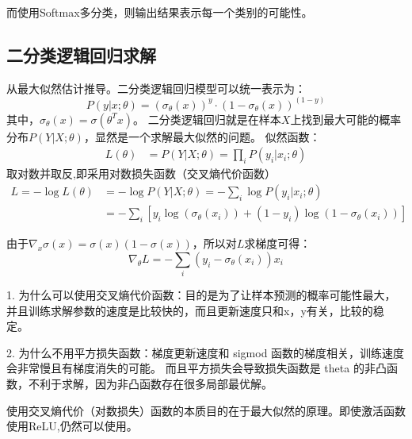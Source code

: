 而使用Softmax多分类，则输出结果表示每一个类别的可能性。

\subsection{二分类逻辑回归求解}
从最大似然估计推导。二分类逻辑回归模型可以统一表示为：
\begin{equation*}
    P(y|x;\theta) = (\sigma_\theta(x))^y \cdot (1-\sigma_\theta(x))^{(1-y)}
\end{equation*}
其中，$\sigma_\theta(x) = \sigma(\theta^T x)$。
二分类逻辑回归就是在样本$X$上找到最大可能的概率分布$P(Y|X;\theta)$，显然是一个求解最大似然的问题。
似然函数：
\begin{align*}
    L(\theta) &= P(Y|X;\theta) = \prod_i P(y_i|x_i;\theta) 
\end{align*}
取对数并取反,即采用对数损失函数（交叉熵代价函数）
\begin{align*}
    L = -\log L(\theta) &= -\log P(Y|X;\theta) = -\sum_i \log P(y_i|x_i;\theta) \\ 
    &= - \sum_i \left[ y_i \log (\sigma_\theta(x_i)) + (1-y_i) \log (1-\sigma_\theta(x_i))\right]
\end{align*}

由于$\nabla_x \sigma(x) = \sigma(x)(1-\sigma(x))$，所以对$L$求梯度可得：
\begin{equation*}
    \nabla_\theta L = -\sum_i (y_i - \sigma_\theta(x_i))x_i
\end{equation*}

{}

1. 为什么可以使用交叉熵代价函数：目的是为了让样本预测的概率可能性最大，
并且训练求解参数的速度是比较快的，而且更新速度只和x，y有关，比较的稳定。

2. 为什么不用平方损失函数：梯度更新速度和 sigmod 函数的梯度相关，训练速度会非常慢且有梯度消失的可能。
而且平方损失会导致损失函数是 theta 的非凸函数，不利于求解，因为非凸函数存在很多局部最优解。

使用交叉熵代价（对数损失）函数的本质目的在于最大似然的原理。即使激活函数使用ReLU,仍然可以使用。

